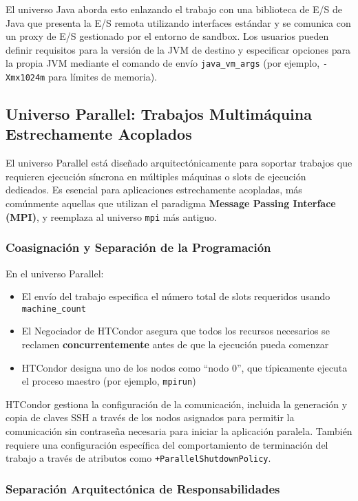 El universo Java aborda esto enlazando el trabajo con una biblioteca de E/S de Java que presenta la E/S remota utilizando interfaces estándar y se comunica con un proxy de E/S gestionado por el entorno de sandbox. Los usuarios pueden definir requisitos para la versión de la JVM de destino y especificar opciones para la propia JVM mediante el comando de envío \texttt{java\_vm\_args} (por ejemplo, \texttt{-Xmx1024m} para límites de memoria).

\subsection{Universo Parallel: Trabajos Multimáquina Estrechamente Acoplados}

El universo Parallel está diseñado arquitectónicamente para soportar trabajos que requieren ejecución síncrona en múltiples máquinas o slots de ejecución dedicados. Es esencial para aplicaciones estrechamente acopladas, más comúnmente aquellas que utilizan el paradigma \textbf{Message Passing Interface (MPI)}, y reemplaza al universo \texttt{mpi} más antiguo.

\subsubsection{Coasignación y Separación de la Programación}

En el universo Parallel:

\begin{itemize}
	\item El envío del trabajo especifica el número total de slots requeridos usando \texttt{machine\_count}
	\item El Negociador de HTCondor asegura que todos los recursos necesarios se reclamen \textbf{concurrentemente} antes de que la ejecución pueda comenzar
	\item HTCondor designa uno de los nodos como ``nodo 0'', que típicamente ejecuta el proceso maestro (por ejemplo, \texttt{mpirun})
\end{itemize}

HTCondor gestiona la configuración de la comunicación, incluida la generación y copia de claves SSH a través de los nodos asignados para permitir la comunicación sin contraseña necesaria para iniciar la aplicación paralela. También requiere una configuración específica del comportamiento de terminación del trabajo a través de atributos como \texttt{+ParallelShutdownPolicy}.

\subsubsection{Separación Arquitectónica de Responsabilidades}

